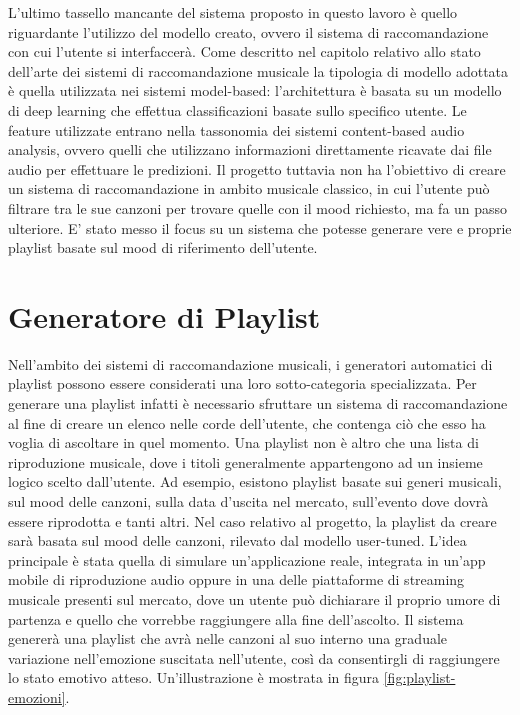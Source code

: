 \documentclass[11pt]{report}
\begin{document}
L'ultimo tassello mancante del sistema proposto in questo lavoro è quello riguardante l'utilizzo del modello creato, ovvero il sistema di raccomandazione con cui l'utente si interfaccerà. Come descritto nel capitolo relativo allo stato dell'arte dei sistemi di raccomandazione musicale la tipologia di modello adottata è quella utilizzata nei sistemi model-based: l'architettura è basata su un modello di deep learning che effettua classificazioni basate sullo specifico utente. Le feature utilizzate entrano nella tassonomia dei sistemi content-based audio analysis, ovvero quelli che utilizzano informazioni direttamente ricavate dai file audio per effettuare le predizioni. Il progetto tuttavia non ha l'obiettivo di creare un sistema di raccomandazione in ambito musicale classico, in cui l'utente può filtrare tra le sue canzoni per trovare quelle con il mood richiesto, ma fa un passo ulteriore. E' stato messo il focus su un sistema che potesse generare vere e proprie playlist basate sul mood di riferimento dell'utente. 


\section{Generatore di Playlist}


Nell'ambito dei sistemi di raccomandazione musicali, i generatori automatici di playlist possono essere considerati una loro sotto-categoria specializzata. Per generare una playlist infatti è necessario sfruttare un sistema di raccomandazione al fine di creare un elenco nelle corde dell'utente, che contenga ciò che esso ha voglia di ascoltare in quel momento. Una playlist non è altro che una lista di riproduzione musicale, dove i titoli generalmente appartengono ad un insieme logico scelto dall'utente. Ad esempio, esistono playlist basate sui generi musicali, sul mood delle canzoni, sulla data d'uscita nel mercato, sull'evento dove dovrà essere riprodotta e tanti altri. Nel caso relativo al progetto, la playlist da creare sarà basata sul mood delle canzoni, rilevato dal modello user-tuned. L'idea principale è stata quella di simulare un'applicazione reale, integrata in un'app mobile di riproduzione audio oppure in una delle piattaforme di streaming musicale presenti sul mercato, dove un utente può dichiarare il proprio umore di partenza e quello che vorrebbe raggiungere alla fine dell'ascolto. Il sistema genererà una playlist che avrà nelle canzoni al suo interno una graduale variazione nell'emozione suscitata nell'utente, così da consentirgli di raggiungere lo stato emotivo atteso. Un'illustrazione è mostrata in figura \ref{fig:playlist-emozioni}.
\end{document}
